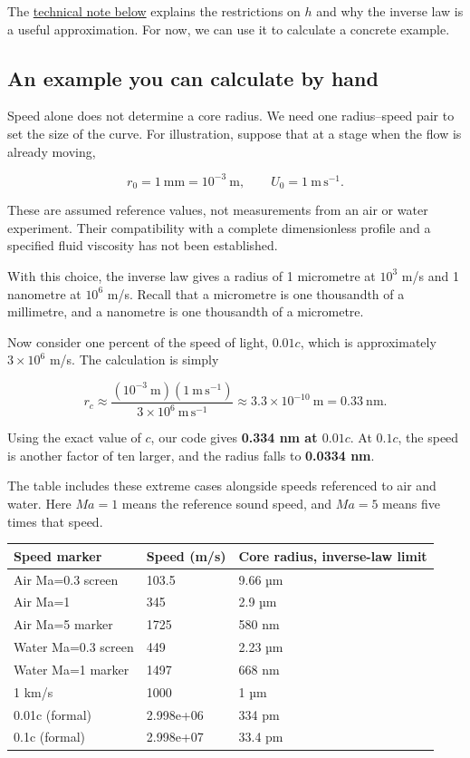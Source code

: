 \documentclass[
  english,
  11pt,
]{article}
\newcounter{none} %
\begin{document}
The \hyperref[technical-note]{technical note below} explains the
restrictions on \(h\) and why the inverse law is a useful approximation.
For now, we can use it to calculate a concrete example.

\subsection{An example you can calculate by
hand}\label{an-example-you-can-calculate-by-hand}

Speed alone does not determine a core radius. We need one radius--speed
pair to set the size of the curve. For illustration, suppose that at a
stage when the flow is already moving,

\[
r_0=1\ \mathrm{mm}=10^{-3}\ \mathrm m,
\qquad
U_0=1\ \mathrm{m\,s^{-1}}.
\]

These are assumed reference values, not measurements from an air or
water experiment. Their compatibility with a complete dimensionless
profile and a specified fluid viscosity has not been established.

With this choice, the inverse law gives a radius of 1 micrometre at
\(10^3\) m/s and 1 nanometre at \(10^6\) m/s. Recall that a micrometre
is one thousandth of a millimetre, and a nanometre is one thousandth of
a micrometre.

Now consider one percent of the speed of light, \(0.01c\), which is
approximately \(3\times10^6\) m/s. The calculation is simply

\[
r_c\approx
\frac{(10^{-3}\ \mathrm m)(1\ \mathrm{m\,s^{-1}})}
{3\times10^6\ \mathrm{m\,s^{-1}}}
\approx 3.3\times10^{-10}\ \mathrm m
=0.33\ \mathrm{nm}.
\]

Using the exact value of \(c\), our code gives \textbf{0.334 nm at
\(0.01c\)}. At \(0.1c\), the speed is another factor of ten larger, and
the radius falls to \textbf{0.0334 nm}.

The table includes these extreme cases alongside speeds referenced to
air and water. Here \(Ma=1\) means the reference sound speed, and
\(Ma=5\) means five times that speed.

{\def\LTcaptype{none} %
\begin{longtable}[]{@{}lll@{}}
\toprule\noalign{}
Speed marker & Speed (m/s) & Core radius, inverse-law limit \\
\midrule\noalign{}
\endhead
\bottomrule\noalign{}
\endlastfoot
Air Ma=0.3 screen & 103.5 & 9.66 µm \\
Air Ma=1 & 345 & 2.9 µm \\
Air Ma=5 marker & 1725 & 580 nm \\
Water Ma=0.3 screen & 449 & 2.23 µm \\
Water Ma=1 marker & 1497 & 668 nm \\
1 km/s & 1000 & 1 µm \\
0.01c (formal) & 2.998e+06 & 334 pm \\
0.1c (formal) & 2.998e+07 & 33.4 pm \\
\end{longtable}
}
\end{document}
